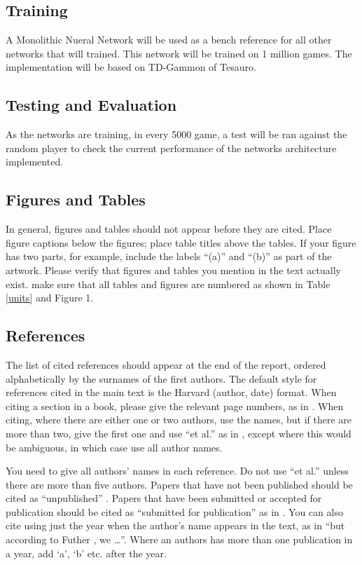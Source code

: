 \documentclass[12pt,a4paper]{article}
\begin{document}
\subsection{Training}
A Monolithic Nueral Network will be used as a bench reference for all other networks that will trained. This network will be trained on 1 million games. The implementation will be based on TD-Gammon of Tesauro. 

\subsection{Testing and Evaluation}
As the networks are training, in every 5000 game, a test will be ran against the random player to check the current performance of the networks architecture implemented. 

\subsection{Figures and Tables}
In general, figures and tables should not appear before they are cited.  Place figure captions below the figures; place table titles above the tables.  If your figure has two parts, for example, include the labels ``(a)'' and ``(b)'' as part of the artwork.  Please verify that figures and tables you mention in the text actually exist.  make sure that all tables and figures are numbered as shown in Table \ref{units} and Figure 1.

\subsection{References}

The list of cited references should appear at the end of the report, ordered alphabetically by the surnames of the first authors.  The default style for references cited in the main text is the  Harvard (author, date) format.  When citing a section in a book, please give the relevant page numbers, as in \cite[p293]{budgen}.  When citing, where there are either one or two authors, use the names, but if there are more than two, give the first one and use ``et al.'' as in  , except where this would be ambiguous, in which case use all author names.

You need to give all authors' names in each reference.  Do not use ``et al.'' unless there are more than five authors.  Papers that have not been published should be cited as ``unpublished'' \cite{euther}.  Papers that have been submitted or accepted for publication should be cited as ``submitted for publication'' as in \cite{futher} .  You can also cite using just the year when the author's name appears in the text, as in ``but according to Futher \citeyear{futher}, we \dots''.  Where an authors has more than one publication in a year, add `a', `b' etc. after the year.





\end{document}
